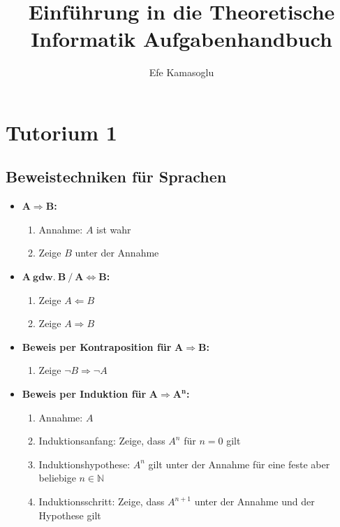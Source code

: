 \documentclass[ieeetran]{article}
\title{Einführung in die Theoretische Informatik Aufgabenhandbuch}
\author{Efe Kamasoglu}
\begin{document}
\maketitle

\pagebreak


\section{Tutorium 1} %
\label{sec:tutorium_1}

\subsection{Beweistechniken für Sprachen} %
\label{sub:beweistechniken_für_sprachen}

\begin{itemize}
	\item $\mathbf{A \Longrightarrow B}$\textbf{:}
		\begin{enumerate}
			\item Annahme: $A$ ist wahr
			\item Zeige $B$ unter der Annahme
		\end{enumerate}
	\item $\mathbf{A \ gdw.\ B \ / \ A \iff B}$\textbf{:}
	 \begin{enumerate}
	   \item Zeige $A \Longleftarrow B$
	\item Zeige $A \Longrightarrow B$
			 \end{enumerate} 

\item \textbf{Beweis per Kontraposition für} $\mathbf{A \Longrightarrow B}$\textbf{:}
	\begin{enumerate}
		\item Zeige $\neg B \Longrightarrow \neg A$
	\end{enumerate}

\item \textbf{Beweis per Induktion für }$\mathbf{A \Longrightarrow A^n}$\textbf{:}
\begin{enumerate}
	\item Annahme: $A$
  \item Induktionsanfang: Zeige, dass $A^n$ für $n = 0$ gilt
  \item Induktionshypothese: $A^n$ gilt unter der Annahme für eine feste aber beliebige $n \in \mathbb{N}$
   
  \item Induktionsschritt: Zeige, dass $A^{n+1}$ unter der Annahme und der Hypothese gilt
\end{enumerate}


\end{itemize}
\end{document}
